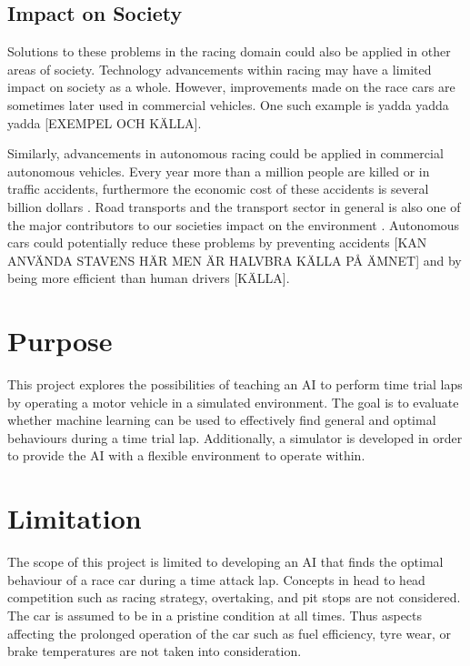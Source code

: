 \subsection{Impact on Society}

Solutions to these problems in the racing domain could also be applied in other areas of society. Technology advancements within racing may have a limited impact on society as a whole. However, improvements made on the race cars are sometimes later used in commercial vehicles. One such example is yadda yadda yadda [EXEMPEL OCH KÄLLA]. 

Similarly, advancements in autonomous racing could be applied in commercial autonomous vehicles. Every year more than a million people are killed or in traffic accidents, furthermore the economic cost of these accidents is several billion dollars \cite{who:traffic}. Road transports and the transport sector in general is also one of the major contributors to our societies impact on the environment \cite{fuglestvedt2008climate}.
Autonomous cars could potentially reduce these problems by preventing accidents [KAN ANVÄNDA STAVENS HÄR MEN ÄR HALVBRA KÄLLA PÅ ÄMNET] and by being more efficient than human drivers [KÄLLA].


\section{Purpose}
\label{purpose}
This project explores the possibilities of teaching an AI to perform time trial laps by operating a motor vehicle in a simulated environment. The goal is to evaluate whether machine learning can be used to effectively find general and optimal behaviours during a time trial lap. Additionally, a simulator is developed in order to provide the AI with a flexible environment to operate within.

\section{Limitation}
The scope of this project is limited to developing an AI that finds the optimal behaviour of a race car during a time attack lap. Concepts in head to head competition such as racing strategy, overtaking, and pit stops are not considered. The car is assumed to be in a pristine condition at all times. Thus aspects affecting the prolonged operation of the car such as fuel efficiency, tyre wear, or brake temperatures are not taken into consideration. 

